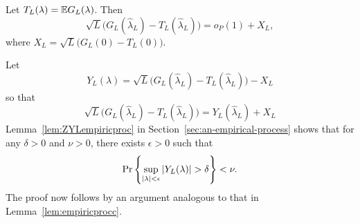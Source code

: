 \documentclass[journal]{IEEEtran}
\begin{document}
\begin{lemma}\label{lem:empiricprocforrho} Let $T_L(\lambda) = {\mathbb E} G_L(\lambda)$.  Then
\[
\sqrt{L}\big( G_L(\hat{\lambda}_L) - T_L(\hat{\lambda}_L) \big) = o_P(1) + X_L,
\]
where $X_L = \sqrt{L} \big( G_L(0) - T_L(0) \big)$.
\end{lemma}
\begin{IEEEproof}
Let
\begin{equation}\label{eq:YLdef}
Y_L(\lambda) = \sqrt{L}\big( G_L(\hat{\lambda}_L) - T_L(\hat{\lambda}_L) \big) - X_L
\end{equation}
so that
\[
\sqrt{L}\big( G_L(\hat{\lambda}_L) - T_L(\hat{\lambda}_L) \big) = Y_L(\hat{\lambda}_L) + X_L
\]
Lemma~\ref{lem:ZYLempiricproc} in Section~\ref{sec:an-empirical-process} shows that for any $\delta > 0$ and $\nu > 0$, there exists $\epsilon > 0$ such that
\[
\Pr\left\{ \sup_{{\vert \lambda \vert}<\epsilon}{\vert Y_L(\lambda) \vert} > \delta  \right\} < \nu.
\]
The proof now follows by an argument analogous to that in Lemma~\ref{lem:empiricprocc}.
\end{IEEEproof}
\end{document}
